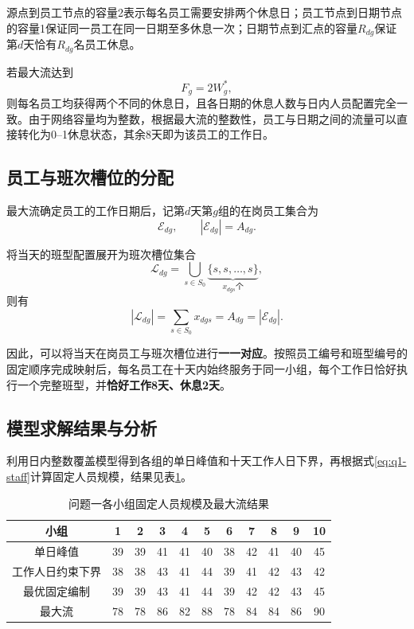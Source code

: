 \documentclass[withoutpreface,bwprint]{cumcmthesis}
\begin{document}
源点到员工节点的容量2表示每名员工需要安排两个休息日；员工节点到日期节点的容量1保证同一员工在同一日期至多休息一次；日期节点到汇点的容量$R_{dg}$保证第$d$天恰有$R_{dg}$名员工休息。

若最大流达到
\begin{equation}
F_g=2W_g^*,
\label{eq:q1-full-flow}
\end{equation}
则每名员工均获得两个不同的休息日，且各日期的休息人数与日内人员配置完全一致。由于网络容量均为整数，根据最大流的整数性，员工与日期之间的流量可以直接转化为0--1休息状态，其余8天即为该员工的工作日。

\subsection{员工与班次槽位的分配}

最大流确定员工的工作日期后，记第$d$天第$g$组的在岗员工集合为
\[
\mathcal E_{dg},
\qquad
|\mathcal E_{dg}|=A_{dg}.
\]

将当天的班型配置展开为班次槽位集合
\begin{equation}
\mathcal L_{dg}
=
\bigcup_{s\in S_0}
\underbrace{\{s,s,\ldots,s\}}_{x_{dgs}\text{个}},
\label{eq:q1-slot-set}
\end{equation}
则有
\[
|\mathcal L_{dg}|
=
\sum_{s\in S_0}x_{dgs}
=
A_{dg}
=
|\mathcal E_{dg}|.
\]

因此，可以将当天在岗员工与班次槽位进行\textbf{一一对应}。按照员工编号和班型编号的固定顺序完成映射后，每名员工在十天内始终服务于同一小组，每个工作日恰好执行一个完整班型，并\textbf{恰好工作8天、休息2天}。

\subsection{模型求解结果与分析}

利用日内整数覆盖模型得到各组的单日峰值和十天工作人日下界，再根据式\eqref{eq:q1-staff}计算固定人员规模，结果见表\ref{tab:q1-result}。

\begin{table}[H]
\centering
\caption{问题一各小组固定人员规模及最大流结果}
\label{tab:q1-result}
\begin{tabular}{c*{10}{c}}
\toprule
小组 & 1&2&3&4&5&6&7&8&9&10\\
\midrule
单日峰值
&39&39&41&41&40&38&42&41&40&45\\
工作人日约束下界
&38&38&43&41&44&39&41&42&43&42\\
最优固定编制
&39&39&43&41&44&39&42&42&43&45\\
最大流
&78&78&86&82&88&78&84&84&86&90\\
\bottomrule
\end{tabular}
\end{table}
\end{document}
